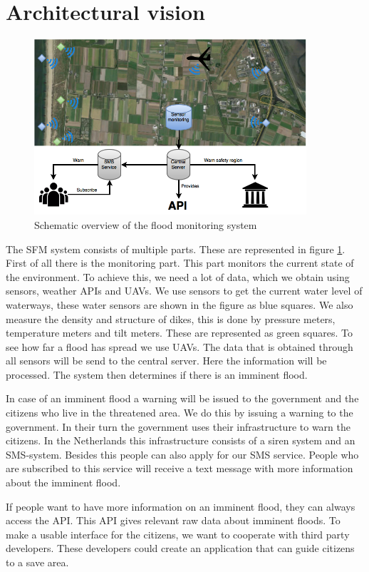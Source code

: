 \section{Architectural vision}
\begin{figure}[hb!]
\includegraphics[keepaspectratio=true,width=0.9\textwidth]{images/archVision.png}
\caption{Schematic overview of the flood monitoring system}
\label{fig:architectural-vision}
\end{figure}

The \gls{SFM} system consists of multiple parts. These are represented in figure \ref{fig:architectural-vision}. First of all there is the monitoring part. This part monitors the current state of the environment. To achieve this, we need a lot of data, which we obtain using sensors, weather \gls{API}s and \gls{UAV}s. We use sensors to get the current water level of waterways, these water sensors are shown in the figure as blue squares. We also measure the density and structure of dikes, this is done by pressure meters, temperature meters and tilt meters. These are represented as green squares. To see how far a flood has spread we use UAVs. The data that is obtained through all sensors will be send to the central server. Here the information will be processed. The system then determines if there is an imminent flood.

In case of an imminent flood a warning will be issued to the government and the citizens who live in the threatened area. We do this by issuing a warning to the government. In their turn the government uses their infrastructure to warn the citizens. In the Netherlands this infrastructure consists of a siren system and an SMS-system. Besides this people can also apply for our SMS service. People who are subscribed to this service will receive a text message with more information about the imminent flood. 

If people want to have more information on an imminent flood, they can always access the API. This API gives relevant raw data about imminent floods. To make a usable interface for the citizens, we want to cooperate with third party developers. These developers could create an application that can guide citizens to a save area.
